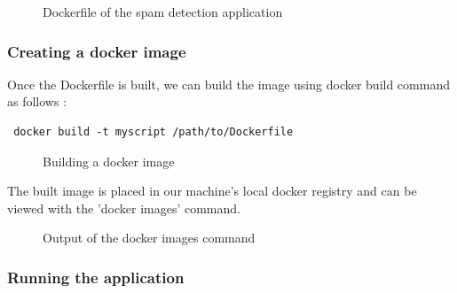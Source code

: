 \documentclass[9pt,twocolumn,twoside]{../../styles/osajnl}
\begin{document}
\begin{figure}[htbp]
\centering
{}
\caption{Dockerfile of the spam detection application}
\label{fig:Dockerfile}
\end{figure}

\subsubsection{Creating a docker image}

Once the Dockerfile is built, we can build the image using docker
build command as follows :

\begin{verbatim}
 docker build -t myscript /path/to/Dockerfile
\end{verbatim}

\begin{figure}[htbp]
\centering
{}
\caption{Building a docker image}
\label{fig:Building the docker image}
\end{figure}



The built image is placed in our machine's local docker registry and
can be viewed with the 'docker images' command.

\begin{figure}[htbp]
\centering
{}
\caption{Output of the docker images command}
\label{fig:Docker Images on the system}
\end{figure}

\subsubsection{Running the application}
\end{document}
